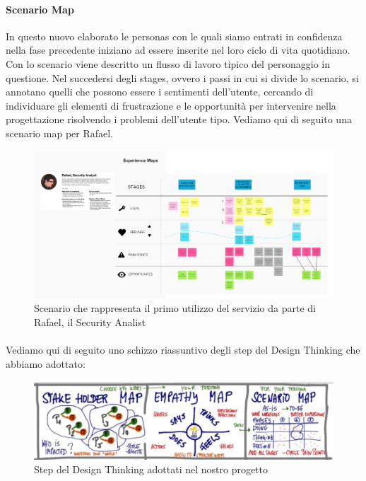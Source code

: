 \paragraph{Scenario Map}
In questo nuovo elaborato le personas con le quali siamo entrati in confidenza nella fase precedente iniziano ad essere inserite nel loro ciclo di vita quotidiano. Con lo scenario viene descritto un flusso di lavoro tipico del personaggio in questione. Nel succedersi degli stages, ovvero i passi in cui si divide lo scenario, si annotano quelli che possono essere i sentimenti dell'utente, cercando di individuare gli elementi di frustrazione e le opportunità per intervenire nella progettazione risolvendo i problemi dell'utente tipo. Vediamo qui di seguito una scenario map per Rafael.
\begin{figure} [h!]
	\centering
	\includegraphics[width=0.7\linewidth]{capitoli/imgs/scenarioRafael.PNG}
	\caption{Scenario che rappresenta il primo utilizzo del servizio da parte di Rafael, il Security Analist }
	\label{fig:scen1}
\end{figure}

\paragraph{}
Vediamo qui di seguito uno schizzo riassuntivo degli step del Design Thinking che abbiamo adottato:
\begin{figure} [h!]
	\centering
	\includegraphics[width=0.7\linewidth]{capitoli/imgs/schizzodesthink.PNG}
	\caption{Step del Design Thinking adottati nel nostro progetto}
	\label{fig:dt}
\end{figure}

